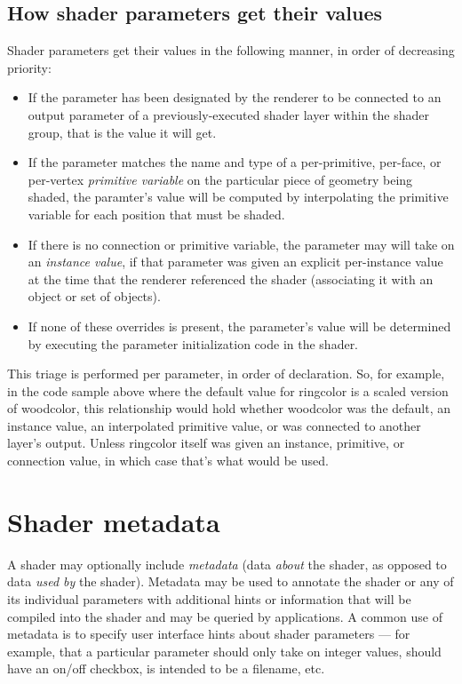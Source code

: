 \documentclass[11pt,letterpaper]{book}
\begin{document}
\subsection{How shader parameters get their values}

Shader parameters get their values in the following manner,
in order of decreasing priority:

\begin{itemize}
\item If the parameter has been designated by the renderer to be
  connected to an output parameter of a previously-executed shader layer
  within the shader group, that is the value it will get.
\item If the parameter matches the name and type of a per-primitive,
  per-face, or per-vertex \emph{primitive variable} on the particular
  piece of geometry being shaded, the paramter's value will be computed
  by interpolating the primitive variable for each position that must be
  shaded.
\item If there is no connection or primitive variable, the parameter may
  will take on an \emph{instance value}, if that parameter was given an
  explicit per-instance value at the time that the renderer referenced
  the shader (associating it with an object or set of objects).
\item If none of these overrides is present, the parameter's value will
  be determined by executing the parameter initialization code in the
  shader.
\end{itemize}

This triage is performed per parameter, in order of declaration.  So,
for example, in the code sample above where the default value for {\cf
  ringcolor} is a scaled version of {\cf woodcolor}, this relationship
would hold whether {\cf woodcolor} was the default, an instance value,
an interpolated primitive value, or was connected to another layer's
output.  Unless {\cf ringcolor} itself was given an instance, primitive,
or connection value, in which case that's what would be used.



\section{Shader metadata}
\label{sec:metadata}
 

A shader may optionally include \emph{metadata} (data \emph{about} the
shader, as opposed to data \emph{used by} the shader).  Metadata may be
used to annotate the shader or any of its individual parameters with
additional hints or information that will be compiled into the shader
and may be queried by applications.  A common use of metadata is to
specify user interface hints about shader parameters --- for example,
that a particular parameter should only take on integer values, should
have an on/off checkbox, is intended to be a filename, etc.
\end{document}
